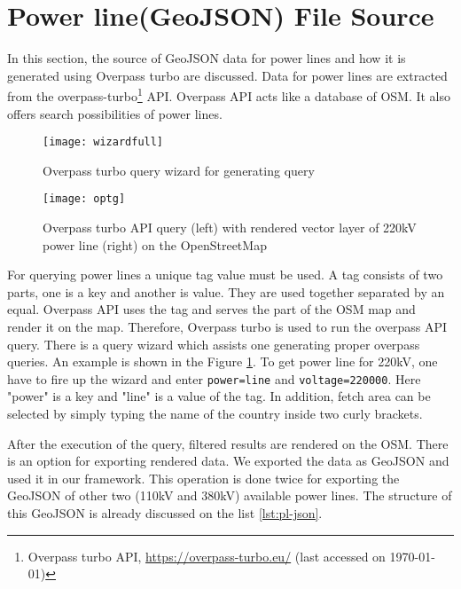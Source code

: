 \section{Power line(GeoJSON) File Source}
\label{sec:plsource}

In this section, the source of GeoJSON data for power lines and how it is generated using Overpass turbo are discussed.
Data for power lines are extracted from the overpass-turbo\footnote{Overpass turbo API, \url{https://overpass-turbo.eu/} (last accessed on {\today})} API. Overpass API acts like a database of OSM. It also offers search possibilities of power lines. 

\begin{figure}
  \begin{center}
    \texttt{[image: wizardfull]}
    \caption{Overpass turbo query wizard for generating query}
    \label{fig:wizard}
  \end{center}
\end{figure} 

\begin{figure} [H]
  \begin{center}
    \texttt{[image: optg]}
    \caption[Overpass turbo API]{Overpass turbo API query (left) with rendered vector layer of 220kV power line (right) on the OpenStreetMap}
    \label{fig:optg}
  \end{center}
\end{figure} 

For querying power lines a unique tag value must be used. A tag consists of two parts, one is a key and another is value. They are used together separated by an equal. Overpass API uses the tag and serves the part of the OSM map and render it on the map. Therefore, Overpass turbo is used to run the overpass API query. There is a query wizard which assists one generating proper overpass queries. An example is shown in the Figure \ref{fig:wizard}. To get power line for 220kV, one have to fire up the wizard and enter \texttt{power=line} and \texttt{voltage=220000}. Here "power" is a key and "line" is a value of the tag. In addition, fetch area can be selected by simply typing the name of the country inside two curly brackets.
  
After the execution of the query, filtered results are rendered on the OSM. There is an option for exporting rendered data. We exported the data as GeoJSON and used it in our framework. This operation is done twice for exporting the GeoJSON of other two (110kV and 380kV) available power lines. The structure of this GeoJSON is already discussed on the list \ref{lst:pl-json}.

 
